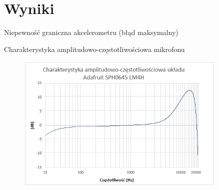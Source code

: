 \documentclass[aspectratio=1610,polish]{beamer} %
\begin{document}
  \section{Wyniki}
  \begin{frame}{Niepewność graniczna akcelerometru (błąd maksymalny)}
    \begin{figure}
      
    \end{figure}
  \end{frame}
  \begin{frame}{Charakterystyka amplitudowo-częstotliwościowa mikrofonu}
    \begin{figure}
      \includegraphics[width=0.9\textwidth,trim={0.15cm 0.15cm 0.15cm 1.5cm},clip]{bitgraphics/charmik.png}
    \end{figure}
  \end{frame}
\end{document}

